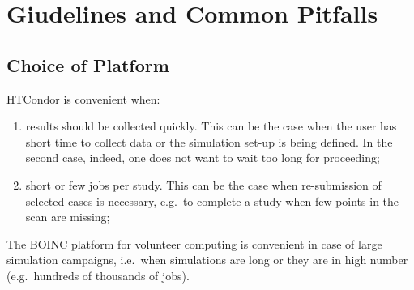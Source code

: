 \chapter{Giudelines and Common Pitfalls} \label{Guidelines}

\section{Choice of Platform}
HTCondor is convenient when:
\begin{enumerate}
\item results should be collected quickly. This can be the case when
  the user has short time to collect data or the simulation set-up
  is being defined. In the second case, indeed, one does not want to wait
  too long for proceeding;
\item short or few jobs per study. This can be the case when re-submission
  of selected cases is necessary, e.g.~to complete a study when few points
  in the scan are missing;
\end{enumerate}  

The BOINC platform for volunteer computing is convenient in case of
large simulation campaigns, i.e.~when simulations are long or they
are in high number (e.g.~hundreds of thousands of jobs).
